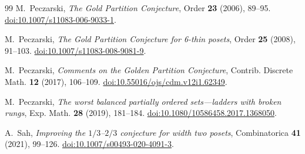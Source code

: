 \documentclass[11pt]{article}
\theoremstyle{definition}
\begin{document}
\begin{thebibliography}{99}
M.~Peczarski,
\emph{The Gold Partition Conjecture},
Order \textbf{23} (2006), 89--95.
\href{https://doi.org/10.1007/s11083-006-9033-1}
{doi:10.1007/s11083-006-9033-1}.

M.~Peczarski,
\emph{The Gold Partition Conjecture for 6-thin posets},
Order \textbf{25} (2008), 91--103.
\href{https://doi.org/10.1007/s11083-008-9081-9}
{doi:10.1007/s11083-008-9081-9}.

M.~Peczarski,
\emph{Comments on the Golden Partition Conjecture},
Contrib. Discrete Math. \textbf{12} (2017), 106--109.
\href{https://doi.org/10.55016/ojs/cdm.v12i1.62349}
{doi:10.55016/ojs/cdm.v12i1.62349}.

M.~Peczarski,
\emph{The worst balanced partially ordered sets---ladders with broken rungs},
Exp. Math. \textbf{28} (2019), 181--184.
\href{https://doi.org/10.1080/10586458.2017.1368050}
{doi:10.1080/10586458.2017.1368050}.

A.~Sah,
\emph{Improving the $1/3$--$2/3$ conjecture for width two posets},
Combinatorica \textbf{41} (2021), 99--126.
\href{https://doi.org/10.1007/s00493-020-4091-3}
{doi:10.1007/s00493-020-4091-3}.

\end{thebibliography}
\end{document}
